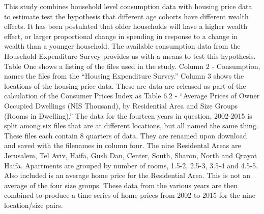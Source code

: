 \documentclass[12pt,a4paper,]{article}
\begin{document}
This study combines household level consumption data with housing price
data to estimate test the hypothesis that different age cohorts have
different wealth effects. It has been postulated that older households
will have a higher wealth effect, or larger proportional change in
spending in response to a change in wealth than a younger household. The
available consumption data from the Household Expenditure Survey
provides us with a means to test this hypothesis. Table One shows a
listing of the files used in the study. Column 2 - Consumption, names
the files from the ``Housing Expenditure Survey.'' Column 3 shows the
locations of the housing price data. These are data are released as part
of the calculation of the Consumer Prices Index as Table 6.2 - ``Average
Prices of Owner Occupied Dwellings (NIS Thousand), by Residential Area
and Size Groups (Rooms in Dwelling).'' The data for the fourteen years
in question, 2002-2015 is split among six files that are at different
locations, but all named the same thing. These files each contain 8
quarters of data. They are renamed upon download and saved with the
filenames in column four. The nine Residental Areas are Jerusalem, Tel
Aviv, Haifa, Gush Dan, Center, South, Sharon, North and Qrayot Haifa.
Apartments are grouped by number of rooms, 1.5-2, 2.5-3, 3.5-4 and
4.5-5. Also included is an average home price for the Residential Area.
This is not an average of the four size groups. These data from the
various years are then combined to produce a time-series of home prices
from 2002 to 2015 for the nine location/size pairs.
\end{document}
